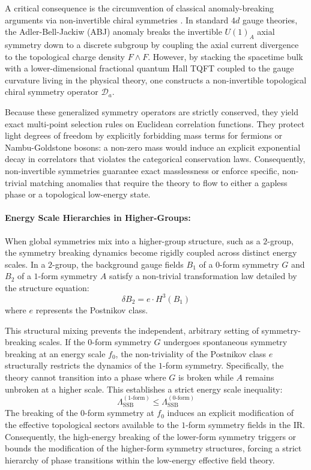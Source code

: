 \documentclass[aps,preprint,nofootinbib,preprintnumbers,eqsecnum,superscriptaddress]{revtex4}
\numberwithin{equation}{section}
\begin{document}
A critical consequence is the circumvention of classical anomaly-breaking arguments via non-invertible chiral symmetries \cite{choi2022noninvertibleglobalsymmetriesstandard, cordova2022noninvertiblechiralsymmetryexponential}. In standard $4d$ gauge theories, the Adler-Bell-Jackiw (ABJ) anomaly breaks the invertible $U(1)_A$ axial symmetry down to a discrete subgroup by coupling the axial current divergence to the topological charge density $F \wedge F$. However, by stacking the spacetime bulk with a lower-dimensional fractional quantum Hall TQFT coupled to the gauge curvature living in the physical theory, one constructs a non-invertible topological chiral symmetry operator $\mathcal{D}_a$.

Because these generalized symmetry operators are strictly conserved, they yield exact multi-point selection rules on Euclidean correlation functions. They protect light degrees of freedom by explicitly forbidding mass terms for fermions or Nambu-Goldstone bosons: a non-zero mass would induce an explicit exponential decay in correlators that violates the categorical conservation laws. Consequently, non-invertible symmetries guarantee exact masslessness or enforce specific, non-trivial matching anomalies that require the theory to flow to either a gapless phase or a topological low-energy state.

\paragraph{Energy Scale Hierarchies in Higher-Groups:}
When global symmetries mix into a higher-group structure, such as a $2$-group, the symmetry breaking dynamics become rigidly coupled across distinct energy scales. In a $2$-group, the background gauge fields $B_1$ of a $0$-form symmetry $G$ and $B_2$ of a $1$-form symmetry $A$ satisfy a non-trivial transformation law detailed by the structure equation:
\begin{equation}
    \delta B_2 = e \cdot H^3(B_1)
\end{equation}
where $e$ represents the Postnikov class. 

This structural mixing prevents the independent, arbitrary setting of symmetry-breaking scales. If the $0$-form symmetry $G$ undergoes spontaneous symmetry breaking at an energy scale $f_0$, the non-triviality of the Postnikov class $e$ structurally restricts the dynamics of the $1$-form symmetry. Specifically, the theory cannot transition into a phase where $G$ is broken while $A$ remains unbroken at a higher scale. This establishes a strict energy scale inequality:
\begin{equation}
    \Lambda_{\text{SSB}}^{(1\text{-form})} \leq \Lambda_{\text{SSB}}^{(0\text{-form})}
\end{equation}
The breaking of the $0$-form symmetry at $f_0$ induces an explicit modification of the effective topological sectors available to the $1$-form symmetry fields in the IR. Consequently, the high-energy breaking of the lower-form symmetry triggers or bounds the modification of the higher-form symmetry structures, forcing a strict hierarchy of phase transitions within the low-energy effective field theory.
\end{document}
